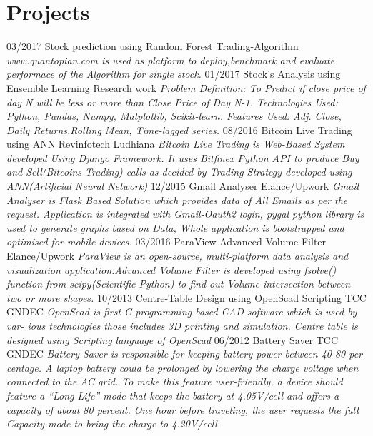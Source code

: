 \documentclass[]{friggeri-cv}
\begin{document}
\section{Projects}
\begin{entrylist} 
 \entry
    {03/2017}
    {Stock prediction using Random Forest}
    {Trading-Algorithm}
    {\emph{www.quantopian.com is used as platform to deploy,benchmark and evaluate performace of the Algorithm for
    single stock.}}
 \entry
    {01/2017}
    {Stock's Analysis using Ensemble Learning}
    {Research work}
    {\emph{Problem Definition: To Predict if close price of day N will be less or more than Close Price of Day N-1.
          Technologies Used: Python, Pandas, Numpy, Matplotlib, Scikit-learn.
          Features Used: Adj. Close, Daily Returns,Rolling Mean, Time-lagged series.}}
 \entry
    {08/2016}
    {Bitcoin Live Trading using ANN}
    {Revinfotech Ludhiana}
    {\emph{Bitcoin Live Trading is Web-Based System developed Using Django
    Framework. It uses Bitfinex Python API to produce Buy and Sell(Bitcoins Trading) calls
    as decided by Trading Strategy developed using ANN(Artificial Neural Network)}}
  \entry
    {12/2015}
    {Gmail Analyser}
    {Elance/Upwork}
    {\emph{Gmail Analyser is Flask Based Solution which provides data of All Emails
as per the request. Application is integrated with Gmail-Oauth2 login, pygal
python library is used to generate graphs based on Data, Whole application
is bootstrapped and optimised for mobile devices.}}
  \entry
    {03/2016}
    {ParaView Advanced Volume Filter}
    {Elance/Upwork}
    {\emph{ParaView is an open-source, multi-platform data analysis and visualization
application.Advanced Volume Filter
is developed using fsolve() function from scipy(Scientific Python) to find out
Volume intersection between two or more shapes.}}
 \entry
    {10/2013}
    {Centre-Table Design using OpenScad Scripting}
    {TCC GNDEC}
    {\emph{OpenScad is first C programming based CAD software which is used by var-
ious technologies those includes 3D printing and simulation. Centre table is
designed using Scripting language of OpenScad}}
 \entry
    {06/2012}
    {Battery Saver}
    {TCC GNDEC}
    {\emph{Battery Saver is responsible for keeping battery power between 40-80 per-
centage. A laptop battery could be prolonged by lowering the charge voltage
when connected to the AC grid. To make this feature user-friendly, a device
should feature a “Long Life” mode that keeps the battery at 4.05V/cell and
offers a capacity of about 80 percent. One hour before traveling, the user
requests the full Capacity mode to bring the charge to 4.20V/cell.}}
\end{entrylist}
\end{document}
